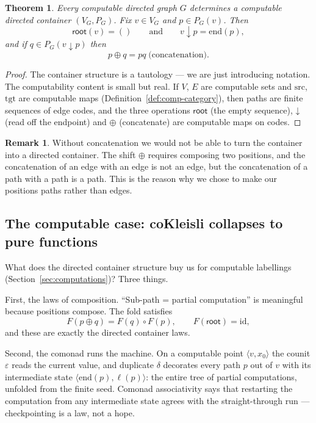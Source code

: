 \documentclass[11pt, a4paper]{article}
\theoremstyle{definition}
\newtheorem{remark}[definition]{Remark}
\theoremstyle{plain}
\newtheorem{theorem}[definition]{Theorem}
\newcommand{\droot}{\mathsf{root}}
\newcommand{\dsub}{\mathbin{\downarrow}}
\newcommand{\dshift}{\mathbin{\oplus}}
\begin{document}
\begin{theorem}\label{thm:main}
Every computable directed graph $G$ determines a computable directed
container $(V_G, P_G)$.
Fix $v \in V_G$ and $p \in P_G(v)$.  Then
\[
  \droot(v) = ()
  \qquad\text{and}\qquad
  v \dsub p = \mathrm{end}(p),
\]
and if $q \in P_G(v \dsub p)$ then
\[
  p \dshift q = pq \;\text{(concatenation)}.
\]
\end{theorem}

\begin{proof}
The container structure is a tautology --- we are just introducing
notation.  The computability content is small but real.  If $V$, $E$ are
computable sets and $\mathrm{src}$, $\mathrm{tgt}$ are computable maps
(Definition~\ref{def:comp-category}), then paths are finite sequences of
edge codes, and the three operations $\droot$ (the empty sequence),
$\dsub$ (read off the endpoint) and $\dshift$ (concatenate) are
computable maps on codes.
\end{proof}

\begin{remark}
Without concatenation we would not be able to turn the container into a
directed container.  The shift $\dshift$ requires composing two
positions, and the concatenation of an edge with an edge is not an
edge, but the concatenation of a path with a path is a path.  This is
the reason why we chose to make our positions paths rather than edges.
\end{remark}

\subsection{The computable case: coKleisli collapses to pure
functions}\label{sec:cokleisli-collapse}

What does the directed container structure buy us for computable
labellings (Section~\ref{sec:computations})?  Three things.

First, the laws of composition.  ``Sub-path = partial computation''
is meaningful because positions compose.  The fold satisfies
\[
  F(p \dshift q) = F(q) \circ F(p),
  \qquad
  F(\droot) = \mathrm{id},
\]
and these are exactly the directed container laws.

Second, the comonad runs the machine.  On a computable point
$\langle v, x_0 \rangle$ the counit $\varepsilon$ reads the current
value, and duplicate $\delta$ decorates every path $p$ out of $v$
with its intermediate state $\langle \mathrm{end}(p), \ell(p)
\rangle$: the entire tree of partial computations, unfolded from the
finite seed.  Comonad associativity says that restarting the
computation from any intermediate state agrees with the
straight-through run --- checkpointing is a law, not a hope.
\end{document}
